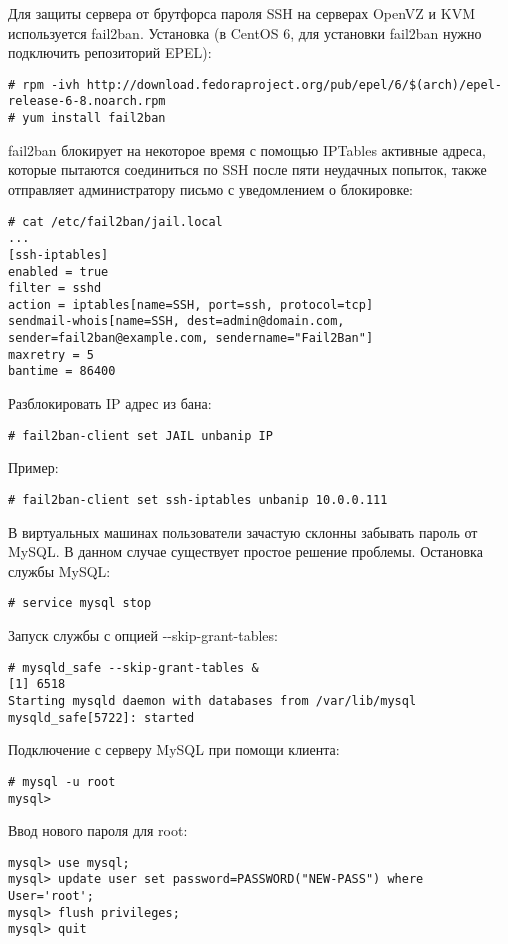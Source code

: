 Для защиты сервера от брутфорса пароля SSH на серверах OpenVZ и KVM используется fail2ban.
Установка (в CentOS 6, для установки fail2ban нужно подключить репозиторий EPEL):
\begin{lstlisting}
# rpm -ivh http://download.fedoraproject.org/pub/epel/6/$(arch)/epel-release-6-8.noarch.rpm
# yum install fail2ban
\end{lstlisting}

fail2ban блокирует на некоторое время с помощью IPTables активные адреса, которые пытаются соединиться по SSH после пяти неудачных попыток, также отправляет администратору письмо с уведомлением о блокировке:
\begin{lstlisting}
# cat /etc/fail2ban/jail.local
...
[ssh-iptables]
enabled = true
filter = sshd
action = iptables[name=SSH, port=ssh, protocol=tcp]
sendmail-whois[name=SSH, dest=admin@domain.com, sender=fail2ban@example.com, sendername="Fail2Ban"]
maxretry = 5
bantime = 86400
\end{lstlisting}

Разблокировать IP адрес из бана:
\begin{lstlisting}
# fail2ban-client set JAIL unbanip IP
\end{lstlisting}

Пример:
\begin{lstlisting}
# fail2ban-client set ssh-iptables unbanip 10.0.0.111
\end{lstlisting}

В виртуальных машинах пользователи зачастую склонны забывать пароль от MySQL.
В данном случае существует простое решение проблемы.
Остановка службы MySQL:
\begin{lstlisting}
# service mysql stop
\end{lstlisting}

Запуск службы с опцией -{}-skip-grant-tables:
\begin{lstlisting}
# mysqld_safe --skip-grant-tables &
[1] 6518
Starting mysqld daemon with databases from /var/lib/mysql
mysqld_safe[5722]: started
\end{lstlisting}

Подключение с серверу MySQL при помощи клиента:
\begin{lstlisting}
# mysql -u root
mysql>
\end{lstlisting}

Ввод нового пароля для root:
\begin{lstlisting}
mysql> use mysql;
mysql> update user set password=PASSWORD("NEW-PASS") where User='root';
mysql> flush privileges;
mysql> quit
\end{lstlisting}

